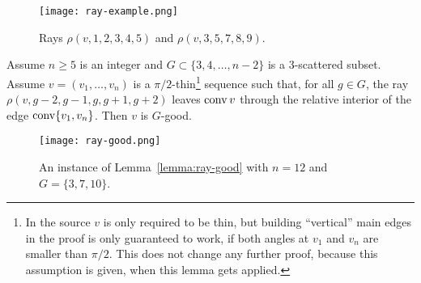 \begin{figure}[h]
  \centering
  \texttt{[image: ray-example.png]}
  \caption{Rays $\rho(v,1,2,3,4,5)$ and $\rho(v,3,5,7,8,9)$. \cite[Figure 5]{shitov2020sublinear}}
  \label{fig:ray-example}
\end{figure}

\begin{lemma}\label{lemma:ray-good}
  Assume $n\geq 5$ is an integer and $G\subset\{3,4,\dots,n-2\}$ is a $3$-scattered subset. Assume $v=(v_1,\dots,v_n)$ is a $\pi/2$-thin\footnote{In the source $v$ is only required to be thin, but building ``vertical'' main edges in the proof is only guaranteed to work, if both angles at $v_1$ and $v_n$ are smaller than $\pi/2$. This does not change any further proof, because this assumption is given, when this lemma gets applied.} sequence such that, for all $g\in G$, the ray $\rho(v, g-2,g-1,g,g+1,g+2)$ leaves $\operatorname{conv} v$ through the relative interior of the edge $\operatorname{conv}\{v_1, v_n\}$. Then $v$ is $G$-good.
\end{lemma}

\begin{figure}[h]
  \centering
  \texttt{[image: ray-good.png]}
  \caption{An instance of Lemma~\ref{lemma:ray-good} with $n=12$ and $G=\{3,7,10\}$. \cite[Figure 7]{shitov2020sublinear}}
  \label{fig:ray-good}
\end{figure}

